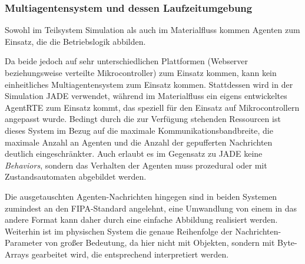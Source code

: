\subsubsection{Multiagentensystem und dessen Laufzeitumgebung}
Sowohl im Teilsystem Simulation als auch im Materialfluss kommen Agenten zum Einsatz, die die Betriebslogik abbilden. 

Da beide jedoch auf sehr unterschiedlichen Plattformen (Webserver beziehungsweise verteilte Mikrocontroller) zum Einsatz kommen, kann kein einheitliches Multiagentensystem zum Einsatz kommen. Stattdessen wird in der Simulation JADE verwendet, während im Materialfluss ein eigens entwickeltes AgentRTE zum Einsatz kommt, das speziell für den Einsatz auf Mikrocontrollern angepasst wurde. Bedingt durch die zur Verfügung stehenden Ressourcen ist dieses System im Bezug auf die maximale Kommunikationsbandbreite, die maximale Anzahl an Agenten und die Anzahl der gepufferten Nachrichten deutlich eingeschränkter. Auch erlaubt es im Gegensatz zu JADE keine \textit{Behaviors}, sondern das Verhalten der Agenten muss prozedural oder mit Zustandsautomaten abgebildet werden.

Die ausgetauschten Agenten-Nachrichten hingegen sind in beiden Systemen zumindest an den FIPA-Standard angelehnt, eine Umwandlung von einem in das andere Format kann daher durch eine einfache Abbildung realisiert werden. Weiterhin ist im physischen System die genaue Reihenfolge der Nachrichten-Parameter von großer Bedeutung, da hier nicht mit Objekten, sondern mit Byte-Arrays gearbeitet wird, die entsprechend interpretiert werden.

